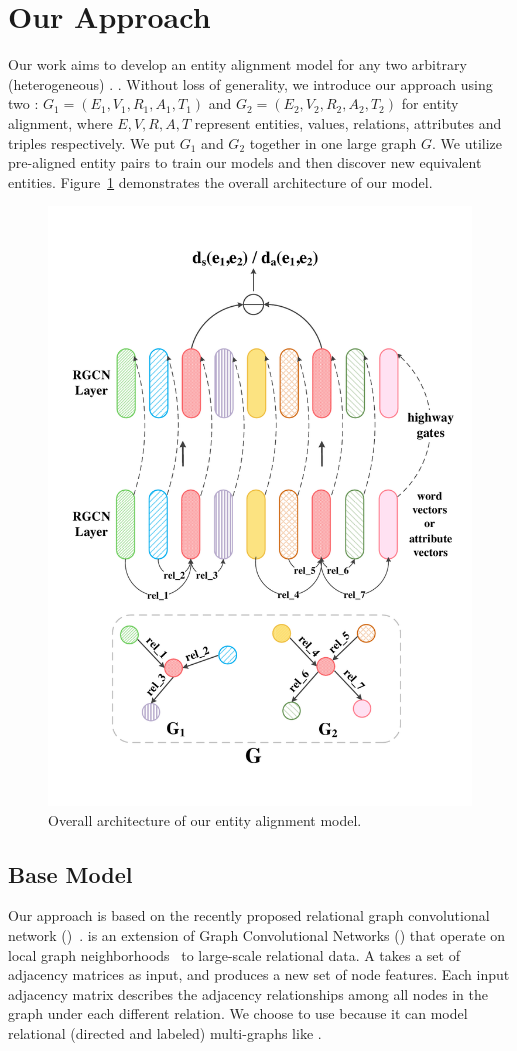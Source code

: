 \section{Our Approach}
	\label{section:app}
	Our work aims to develop an entity alignment model for any two arbitrary (heterogeneous) \KGs. . Without loss of generality, we
introduce our approach using two \KGs: $G_1 = (E_1,V_1,R_1,A_1,T_1)$ and $G_2 = (E_2,V_2,R_2,A_2,T_2)$ for entity alignment, where
$E,V,R,A,T$ represent entities, values, relations, attributes and triples respectively. 	We put $G_1$ and $G_2$ together in one large
graph $G$. We utilize pre-aligned entity pairs to train our models and then discover new equivalent entities. Figure~\ref{all} demonstrates
the overall architecture of our model. 	
	
	\begin{figure}[t!]
		\centering
			\includegraphics[width=0.8\linewidth]{figures/graph2.pdf}
			\caption{Overall architecture of our entity alignment model.}
			\label{all}
	\end{figure}
	
    \subsection{Base Model}
    Our approach is based on the recently proposed relational graph convolutional network (\RGCN)~\cite{Schlichtkrull2017Modeling}.
    \RGCN is an extension of Graph Convolutional Networks (\GCNs) that operate on local graph neighborhoods~\cite{Duvenaud2015Convolutional,Kipf2016Semi} to large-scale relational data.
    A \RGCN takes a set of adjacency matrices as input, and produces a new set of node features.
    Each input adjacency matrix describes the adjacency relationships among all nodes in the graph under each different relation.
    We choose to use \RGCN because it can model relational (directed and labeled) multi-graphs like \KGs.


